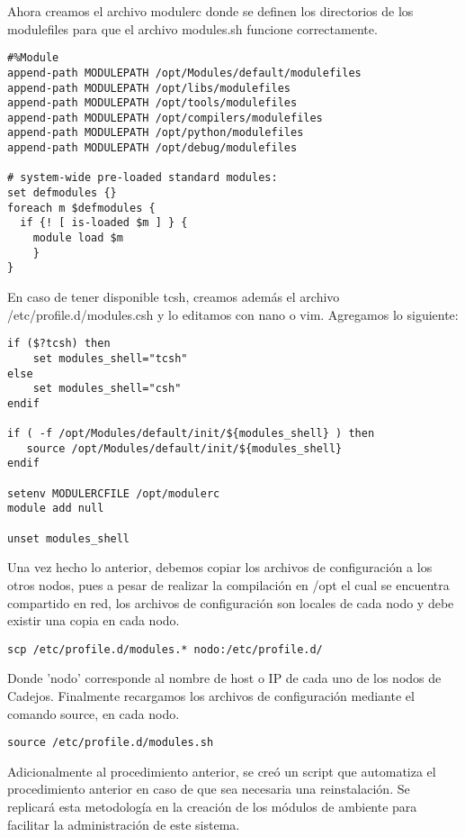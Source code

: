 Ahora creamos el archivo modulerc donde se definen los directorios de los modulefiles para que el archivo modules.sh funcione correctamente.

\begin{lstlisting} 
#%Module
append-path MODULEPATH /opt/Modules/default/modulefiles
append-path MODULEPATH /opt/libs/modulefiles
append-path MODULEPATH /opt/tools/modulefiles
append-path MODULEPATH /opt/compilers/modulefiles
append-path MODULEPATH /opt/python/modulefiles
append-path MODULEPATH /opt/debug/modulefiles

# system-wide pre-loaded standard modules:
set defmodules {}
foreach m $defmodules {
  if {! [ is-loaded $m ] } {
    module load $m
    }
}
\end{lstlisting}

En caso de tener disponible tcsh, creamos además el archivo /etc/profile.d/modules.csh y lo editamos con nano o vim. Agregamos lo siguiente:

\begin{lstlisting} 
if ($?tcsh) then
	set modules_shell="tcsh"
else
	set modules_shell="csh"
endif

if ( -f /opt/Modules/default/init/${modules_shell} ) then
   source /opt/Modules/default/init/${modules_shell}
endif

setenv MODULERCFILE /opt/modulerc
module add null

unset modules_shell

\end{lstlisting}

Una vez hecho lo anterior, debemos copiar los archivos de configuración a los otros nodos, pues a pesar de realizar la compilación en /opt el cual se encuentra compartido en red, los archivos de configuración son locales de cada nodo y debe existir una copia en cada nodo.

\begin{lstlisting} 
scp /etc/profile.d/modules.* nodo:/etc/profile.d/
\end{lstlisting}

Donde 'nodo' corresponde al nombre de host o IP de cada uno de los nodos de Cadejos. Finalmente recargamos los archivos de configuración mediante el comando source, en cada nodo.

\begin{lstlisting}
source /etc/profile.d/modules.sh
\end{lstlisting}

Adicionalmente al procedimiento anterior, se creó un script que automatiza el procedimiento anterior en caso de que sea necesaria una reinstalación. Se replicará esta metodología en la creación de los módulos de ambiente para facilitar la administración de este sistema.

